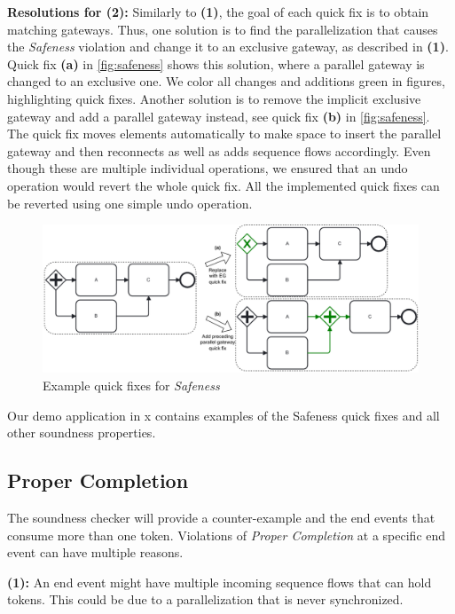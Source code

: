 \documentclass[runningheads]{llncs}
\begin{document}
\textbf{Resolutions for (2):} Similarly to \textbf{(1)}, the goal of each quick fix is to obtain matching gateways.
Thus, one solution is to find the parallelization that causes the \textit{Safeness} violation and change it to an exclusive gateway, as described in \textbf{(1)}.
Quick fix \textbf{(a)} in \autoref{fig:safeness} shows this solution, where a parallel gateway is changed to an exclusive one.
We color all changes and additions green in figures, highlighting quick fixes.
Another solution is to remove the implicit exclusive gateway and add a parallel gateway instead, see quick fix \textbf{(b)} in \autoref{fig:safeness}.
The quick fix moves elements automatically to make space to insert the parallel gateway and then reconnects as well as adds sequence flows accordingly.
Even though these are multiple individual operations, we ensured that an undo operation would revert the whole quick fix.
All the implemented quick fixes can be reverted using one simple undo operation.

\begin{figure}[ht]
	\centering
	\includegraphics[width=1\textwidth]{images/safeness}
	\caption{Example quick fixes for \textit{Safeness}}
	\label{fig:safeness}
\end{figure}

Our demo application in x contains examples of the Safeness quick fixes and all other soundness properties.

\subsection{Proper Completion}
The soundness checker will provide a counter-example and the end events that consume more than one token.
Violations of \textit{Proper Completion} at a specific end event can have multiple reasons.

\textbf{(1):} An end event might have multiple incoming sequence flows that can hold tokens.
This could be due to a parallelization that is never synchronized.
\end{document}
